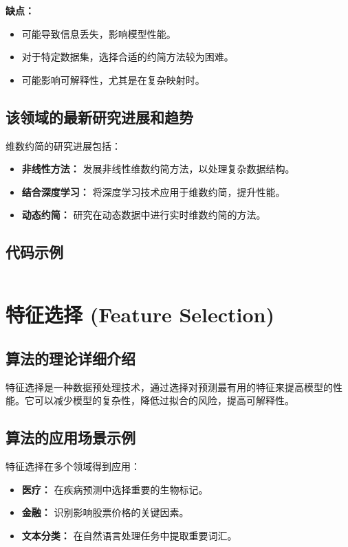 \textbf{缺点：}
\begin{itemize}
    \item 可能导致信息丢失，影响模型性能。
    \item 对于特定数据集，选择合适的约简方法较为困难。
    \item 可能影响可解释性，尤其是在复杂映射时。
\end{itemize}

\subsection*{该领域的最新研究进展和趋势}
维数约简的研究进展包括：
\begin{itemize}
    \item \textbf{非线性方法：} 发展非线性维数约简方法，以处理复杂数据结构。
    \item \textbf{结合深度学习：} 将深度学习技术应用于维数约简，提升性能。
    \item \textbf{动态约简：} 研究在动态数据中进行实时维数约简的方法。
\end{itemize}
\subsection*{代码示例}
\begin{lstlisting}

\end{lstlisting}


\section{特征选择 (Feature Selection)}
\subsection*{算法的理论详细介绍}
特征选择是一种数据预处理技术，通过选择对预测最有用的特征来提高模型的性能。它可以减少模型的复杂性，降低过拟合的风险，提高可解释性。

\subsection*{算法的应用场景示例}
特征选择在多个领域得到应用：
\begin{itemize}
    \item \textbf{医疗：} 在疾病预测中选择重要的生物标记。
    \item \textbf{金融：} 识别影响股票价格的关键因素。
    \item \textbf{文本分类：} 在自然语言处理任务中提取重要词汇。
\end{itemize}

